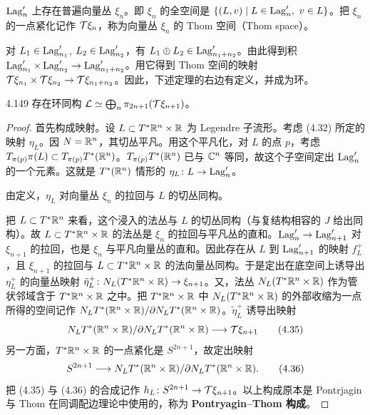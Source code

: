 $\operatorname{Lag}'_n$ 上存在普遍向量丛 $\xi_n$。即 $\xi_n$ 的全空间是 $\{(L,v)\mid L\in\operatorname{Lag}'_n,\ v\in L\}$。把 $\xi_n$ 的一点紧化记作 $\mathcal{T}\xi_n$，称为向量丛 $\xi_n$ 的 Thom 空间（Thom space）。

对 $L_1\in\operatorname{Lag}'_{n_1}$, $L_2\in\operatorname{Lag}'_{n_2}$，有 $L_1\oplus L_2\in\operatorname{Lag}'_{n_1+n_2}$。由此得到积 $\operatorname{Lag}'_{n_1}\times\operatorname{Lag}'_{n_2}\to\operatorname{Lag}'_{n_1+n_2}$。用它得到 Thom 空间的映射 $\mathcal{T}\xi_{n_1}\times\mathcal{T}\xi_{n_2}\to\mathcal{T}\xi_{n_1+n_2}$。因此，下述定理的右边有定义，并成为环。

\begin{theorem*}{4.149}
  存在环同构 $\mathcal{L}\simeq\bigoplus_n\pi_{2n+1}(\mathcal{T}\xi_{n+1})$。
\end{theorem*}

\begin{proof}
  首先构成映射。设 $L\subset T^*\mathbb{R}^n\times\mathbb{R}$ 为 Legendre 子流形。考虑 (4.32) 所定的映射 $\eta_L$。因 $N=\mathbb{R}^n$，其切丛平凡。用这个平凡化，对 $L$ 的点 $p$，考虑 $T_{\pi(p)}\pi(L)\subset T_{\pi(p)}T^*(\mathbb{R}^n)$。$T_{\pi(p)}T^*(\mathbb{R}^n)$ 已与 $\mathbb{C}^n$ 等同，故这个子空间定出 $\operatorname{Lag}'_n$ 的一个元素。这就是 $T^*(\mathbb{R}^n)$ 情形的 $\eta_L\colon L\to\operatorname{Lag}'_n$。

  由定义，$\eta_L$ 对向量丛 $\xi_n$ 的拉回与 $L$ 的切丛同构。

  把 $L\subset T^*\mathbb{R}^n$ 来看，这个浸入的法丛与 $L$ 的切丛同构（与复结构相容的 $J$ 给出同构）。故 $L\subset T^*\mathbb{R}^n\times\mathbb{R}$ 的法丛是 $\xi_n$ 的拉回与平凡丛的直和。$\operatorname{Lag}'_n\to\operatorname{Lag}'_{n+1}$ 对 $\xi_{n+1}$ 的拉回，也是 $\xi_n$ 与平凡向量丛的直和。因此存在从 $L$ 到 $\operatorname{Lag}'_{n+1}$ 的映射 $f_L^+$，且 $\xi_{n+1}$ 的拉回与 $L\subset T^*\mathbb{R}^n\times\mathbb{R}$ 的法向量丛同构。于是定出在底空间上诱导出 $\eta_L^+$ 的向量丛映射 $\tilde\eta_L^+\colon N_L(T^*\mathbb{R}^n\times\mathbb{R})\to\xi_{n+1}$。又，法丛 $N_L(T^*\mathbb{R}^n\times\mathbb{R})$ 作为管状邻域含于 $T^*\mathbb{R}^n\times\mathbb{R}$ 之中。把 $T^*\mathbb{R}^n\times\mathbb{R}$ 中 $N_L(T^*\mathbb{R}^n\times\mathbb{R})$ 的外部收缩为一点所得的空间记作 $N_LT^*(\mathbb{R}^n\times\mathbb{R})/\partial N_LT^*(\mathbb{R}^n\times\mathbb{R})$。$\tilde\eta_L^+$ 诱导出映射
  \begin{equation}
    N_LT^*(\mathbb{R}^n\times\mathbb{R})/\partial N_LT^*(\mathbb{R}^n\times\mathbb{R})\longrightarrow\mathcal{T}\xi_{n+1} \tag{4.35}
  \end{equation}
  另一方面，$T^*\mathbb{R}^n\times\mathbb{R}$ 的一点紧化是 $S^{2n+1}$，故定出映射
  \begin{equation}
    S^{2n+1}\longrightarrow N_LT^*(\mathbb{R}^n\times\mathbb{R})/\partial N_LT^*(\mathbb{R}^n\times\mathbb{R}). \tag{4.36}
  \end{equation}
  把 (4.35) 与 (4.36) 的合成记作 $h_L\colon S^{2n+1}\to\mathcal{T}\xi_{n+1}$。以上构成原本是 Pontrjagin 与 Thom 在同调配边理论中使用的，称为 \textbf{Pontryagin--Thom 构成}。


\end{proof}

